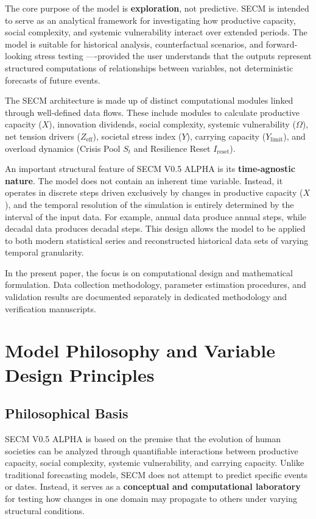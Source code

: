 \documentclass[12pt,a4paper]{article}
\begin{document}
The core purpose of the model is \textbf{ exploration}, not predictive. SECM is intended to serve as an analytical framework for investigating how productive capacity, social complexity, and systemic vulnerability interact over extended periods. The model is suitable for historical analysis, counterfactual scenarios, and forward-looking stress testing ----provided the user understands that the outputs represent structured computations of relationships between variables, not deterministic forecasts of future events.

The SECM architecture is made up of distinct computational modules linked through well-defined data flows. These include modules to calculate productive capacity (\(X\)), innovation dividends, social complexity, systemic vulnerability (\(\Omega\)), net tension drivers (\(Z_{\mathrm{eff}}\)), societal stress index (\(Y\)), carrying capacity (\(Y_{\mathrm{limit}}\)), and overload dynamics (Crisis Pool \(S_t\) and Resilience Reset \(I_{\mathrm{reset}}\)).

An important structural feature of SECM V0.5 ALPHA is its \textbf{time-agnostic nature}. The model does not contain an inherent time variable. Instead, it operates in discrete steps driven exclusively by changes in productive capacity (\(X\)), and the temporal resolution of the simulation is entirely determined by the interval of the input data. For example, annual data produce annual steps, while decadal data produces decadal steps. This design allows the model to be applied to both modern statistical series and reconstructed historical data sets of varying temporal granularity.

In the present paper, the focus is on computational design and mathematical formulation. Data collection methodology, parameter estimation procedures, and validation results are documented separately in dedicated methodology and verification manuscripts.
\section{Model Philosophy and Variable Design Principles}

\subsection{Philosophical Basis}
SECM V0.5 ALPHA is based on the premise that the evolution of human societies can be analyzed through quantifiable interactions between productive capacity, social complexity, systemic vulnerability, and carrying capacity. Unlike traditional forecasting models, SECM does not attempt to predict specific events or dates. Instead, it serves as a \textbf{conceptual and computational laboratory} for testing how changes in one domain may propagate to others under varying structural conditions.
\end{document}
